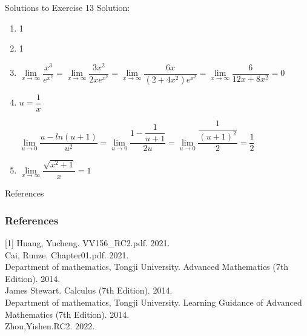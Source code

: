 \begin{frame}{Solutions to Exercise 13}
	Solution:
	\begin{enumerate}
		\item 1
		\item 1
		\item $\lim\limits_{\textit{x} \to \infty}\dfrac{x^3}{e^{x^2}} = \lim\limits_{\textit{x} \to \infty} \dfrac{3x^2}{2xe^{x^2}} = \lim\limits_{\textit{x} \to \infty} \dfrac{6x}{(2 + 4x^2)e^{x^2}} =  \lim\limits_{\textit{x} \to \infty} \dfrac{6}{12x + 8x^2} = 0$
		\item $ u = \dfrac{1}{x}$


		      $\lim\limits_{\textit{u} \to 0} \dfrac{u - ln(u+1)}{u^2} = \lim\limits_{\textit{u} \to 0} \dfrac{1 - \dfrac{1}{u+1}}{2u} = \lim\limits_{\textit{u} \to 0} \dfrac{\dfrac{1}{(u+1)^2}}{2} = \dfrac{1}{2}$
		\item $\lim\limits_{\textit{x} \to \infty} \dfrac{\sqrt{x^2 + 1}}{x} = 1$
	\end{enumerate}
	\label{ans:exercise13}
\end{frame}

\begin{frame}{References}
	\frametitle{References}
	[1] Huang, Yucheng. VV156\_RC2.pdf. 2021.\\
	\bigskip
	[2] Cai, Runze. Chapter01.pdf. 2021.\\
	\bigskip
	[3] Department of mathematics, Tongji University. Advanced Mathematics (7th Edition). 2014.\\
	\bigskip
	[4] James Stewart. Calculus (7th Edition). 2014.\\
	\bigskip
	[5] Department of mathematics, Tongji University. Learning Guidance of Advanced Mathematics (7th Edition). 2014.\\
	\bigskip
	[6]Zhou,Yishen.RC2. 2022.
\end{frame}